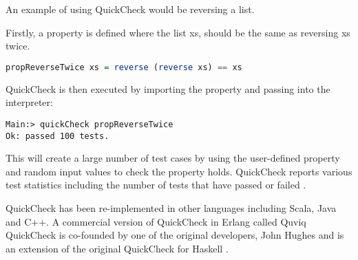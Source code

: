 An example of using QuickCheck would be reversing a list.

Firstly, a property is defined where the list xs, should be the same as reversing xs twice.

\begin{lstlisting}[language=haskell]
propReverseTwice xs = reverse (reverse xs) == xs
\end{lstlisting}

QuickCheck is then executed by importing the property and passing into the interpreter:

\begin{lstlisting}
Main:> quickCheck propReverseTwice
Ok: passed 100 tests.
\end{lstlisting}

This will create a large number of test cases by using the user-defined property and random input values to check the property holds. QuickCheck reports various test statistics including the number of tests that have passed or failed \cite{QClightweight}.

QuickCheck has been re-implemented in other languages including Scala, Java and C++. A commercial version of QuickCheck in Erlang called Quviq QuickCheck is co-founded by one of the original developers, John Hughes and is an extension of the original QuickCheck for Haskell \cite{QCFunProfit}.

